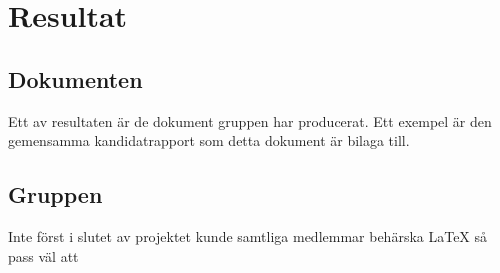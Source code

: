 \section{Resultat}
\subsection{Dokumenten}
Ett av resultaten är de dokument gruppen har producerat. Ett exempel är den gemensamma kandidatrapport som detta dokument är bilaga till. 

\subsection{Gruppen}
Inte först i slutet av projektet kunde samtliga medlemmar behärska {\LaTeX} så pass väl att   